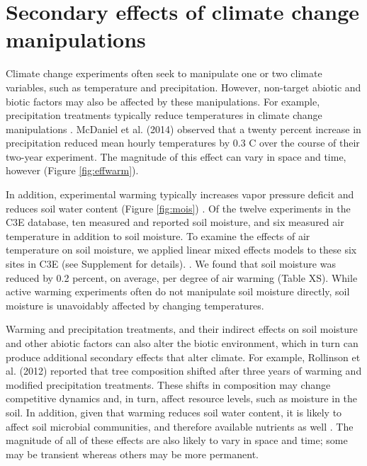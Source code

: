 \documentclass{article}
\begin{document}
\section* {Secondary effects of climate change manipulations}
Climate change experiments often seek to manipulate one or two climate variables, such as temperature and precipitation. However, non-target abiotic and biotic factors may also be affected by these manipulations. For example, precipitation treatments typically reduce temperatures in climate change manipulations \citep{sherry2007,rollinson2012,mcdaniel2014}. McDaniel et al. (2014) observed that a twenty percent increase in precipitation reduced mean hourly temperatures by 0.3 \degree C over the course of their two-year experiment. The magnitude of this effect can vary in space and time, however (Figure \ref{fig:effwarm}). 
\par In addition, experimental warming typically increases vapor pressure deficit and reduces soil water content (Figure \ref{fig:mois}) \citep[e.g.,][]{sherry2007,morin2010,templer2016}. Of the twelve experiments in the C3E database, ten measured and reported soil moisture, and six measured air temperature in addition to soil moisture. %
To examine the effects of air temperature on soil moisture, we applied linear mixed effects models to these six sites in C3E (see Supplement for details). .
We found that soil moisture was reduced by 0.2 percent, on average, per degree of air warming (Table XS). While active warming experiments often do not manipulate soil moisture directly, soil moisture is unavoidably affected by changing temperatures. 
\par Warming and precipitation treatments, and their indirect effects on soil moisture and other abiotic factors can also alter the biotic environment, which in turn can produce additional secondary effects that alter climate. For example, Rollinson et al. (2012) reported that tree composition shifted after three years of warming and modified precipitation treatments. These shifts in composition may change competitive dynamics and, in turn, affect resource levels, such as moisture in the soil. In addition, given that warming reduces soil water content, it is likely to affect soil microbial communities, and therefore available nutrients as well \citep{mcdaniel2014,mcdaniel2014b}. The magnitude of all of these effects are also likely to vary in space and time; some may be transient whereas others may be more permanent. %
\end{document}
